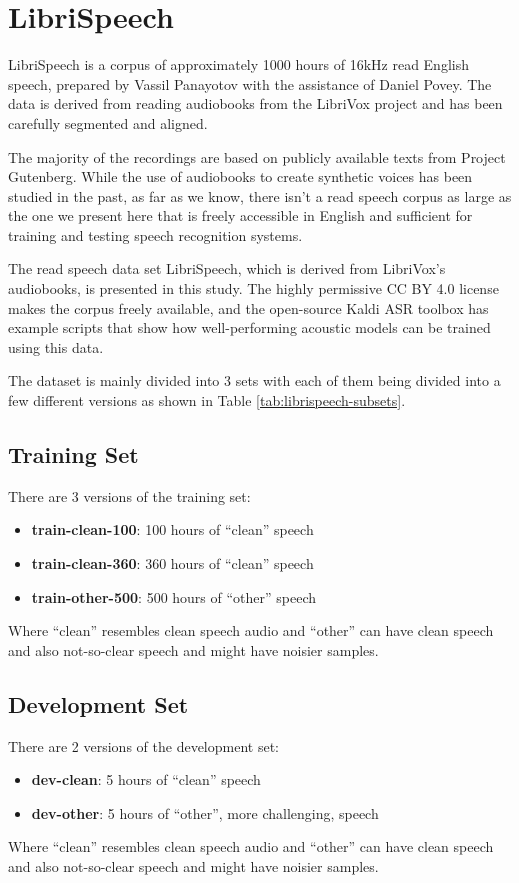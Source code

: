 \section{LibriSpeech}
LibriSpeech \cite{librispeech} is a corpus of approximately 1000 hours of 16kHz read English speech, prepared by Vassil Panayotov with the assistance of Daniel Povey. The data is derived from reading audiobooks from the LibriVox project and has been carefully segmented and aligned.

The majority of the recordings are based on publicly available texts from Project Gutenberg.
While the use of audiobooks to create synthetic voices has been studied in the past, as far as we know, there isn't a read speech corpus as large as the one we present here that is freely accessible in English and sufficient for training and testing speech recognition systems.

The read speech data set LibriSpeech, which is derived from LibriVox's audiobooks, is presented in this study. The highly permissive CC BY 4.0 license makes the corpus freely available, and the open-source Kaldi ASR toolbox has example scripts that show how well-performing acoustic models can be trained using this data.

The dataset is mainly divided into 3 sets with each of them being divided into a few different versions as shown in Table \ref{tab:librispeech-subsets}.

\subsection{Training Set}
There are 3 versions of the training set:
\begin{itemize}
    \item \textbf{train-clean-100}: 100 hours of “clean” speech
    \item \textbf{train-clean-360}: 360 hours of “clean” speech
    \item \textbf{train-other-500}: 500 hours of “other” speech
\end{itemize}
Where “clean” resembles clean speech audio and “other” can have clean speech and also not-so-clear speech and might have noisier samples.

\subsection{Development Set}
There are 2 versions of the development set:
\begin{itemize}
    \item \textbf{dev-clean}: 5 hours of “clean” speech
    \item \textbf{dev-other}: 5 hours of “other”, more challenging, speech
\end{itemize}
Where “clean” resembles clean speech audio and “other” can have clean speech and also not-so-clear speech and might have noisier samples.

